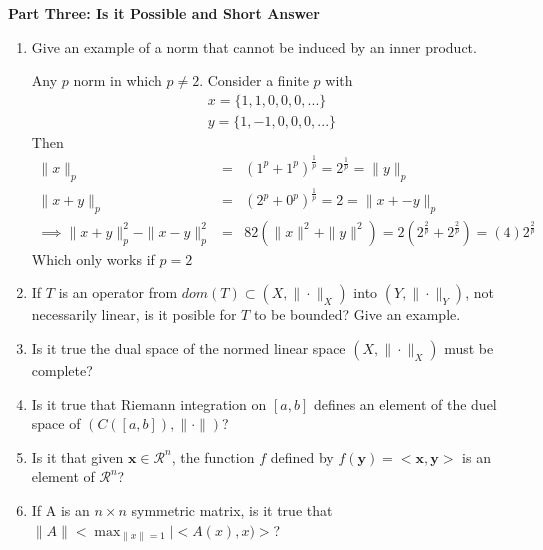\documentclass[11pt]{SelfArxOneColBMN}
\begin{document}
\textbf{Part Three: Is it Possible and Short Answer}
\begin{enumerate}
  \item Give an example of a norm that cannot be induced by an inner product.
  \begin{solution}
    Any $p$ norm in which $p \neq 2$. Consider a finite $p$ with
    \begin{eqnarray*}
      x = \{1,1,0,0,0,...\}\\
      y = \{1,-1,0,0,0,...\}
    \end{eqnarray*}
    Then
    \begin{eqnarray*}
      \|x\|_p &=& (1^p + 1^p)^\frac{1}{p} = 2^\frac{1}{p} = \|y\|_p\\
      \|x + y\|_p &=& (2^p + 0^p)^\frac{1}{p} = 2 = \|x + -y\|_p\\
      \implies \|x + y\|_p^2 - \|x - y\|_p^2 &=& 8
      2(\|x\|^2 + \|y\|^2) = 2(2^\frac{2}{p} + 2^\frac{2}{p}) = (4)2^\frac{2}{p}
    \end{eqnarray*}
    Which only works if $p = 2$
  \end{solution}
  \item If $T$ is an operator from $dom(T) \subset (X,\|\cdot\|_X)$ into $(Y,\|\cdot\|_Y)$, not necessarily linear, is it posible for $T$ to be bounded? Give an example.
  \item Is it true the dual space of the normed linear space $(X,\|\cdot\|_X)$ must be complete?
  \item Is it true that Riemann integration on $[a,b]$ defines an element of the duel space of $(C([a,b]),\|\cdot\|)$?
  \item Is it that given $\mathbf{x} \in \mathcal{R}^n$, the function $f$ defined by $f(\mathbf{y}) = <\mathbf{x},\mathbf{y}>$ is an element of $\mathcal{R}^n$?
  \item If A is an $n \times n$ symmetric matrix, is it true that $\|A\| < \max_{\|x\| = 1}|<A(x),x)>$?
\end{enumerate}
\end{document}
